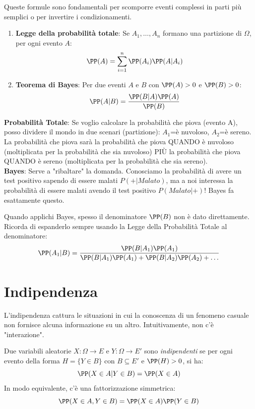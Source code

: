 Queste formule sono fondamentali per scomporre eventi complessi in parti più semplici o per invertire i condizionamenti.

\begin{theorem}
\begin{enumerate}
    \item \textbf{Legge della probabilità totale}: Se $A_1, \dots, A_n$ formano una partizione di $\Omega$, per ogni evento $A$:
    \[ \PP(A) = \sum_{i=1}^n \PP(A_i) \PP(A|A_i) \]
    \item \textbf{Teorema di Bayes}: Per due eventi $A$ e $B$ con $\PP(A)>0$ e $\PP(B)>0$:
    \[ \PP(A|B) = \frac{\PP(B|A)\PP(A)}{\PP(B)} \]
\end{enumerate}
\end{theorem}

\begin{spiegazione}
    \textbf{Probabilità Totale}: Se voglio calcolare la probabilità che piova (evento A), posso dividere il mondo in due scenari (partizione): $A_1$=è nuvoloso, $A_2$=è sereno. La probabilità che piova sarà la probabilità che piova QUANDO è nuvoloso (moltiplicata per la probabilità che sia nuvoloso) PIÙ la probabilità che piova QUANDO è sereno (moltiplicata per la probabilità che sia sereno). \\
    \textbf{Bayes}: Serve a "ribaltare" la domanda. Conosciamo la probabilità di avere un test positivo sapendo di essere malati $P(+|Malato)$, ma a noi interessa la probabilità di essere malati avendo il test positivo $P(Malato|+)$! Bayes fa esattamente questo.
\end{spiegazione}

\begin{hint}
    Quando applichi Bayes, spesso il denominatore $\PP(B)$ non è dato direttamente. Ricorda di espanderlo sempre usando la Legge della Probabilità Totale al denominatore: 
    \[ \PP(A_1|B) = \frac{\PP(B|A_1)\PP(A_1)}{\PP(B|A_1)\PP(A_1) + \PP(B|A_2)\PP(A_2) + \dots} \]
\end{hint}

\section{Indipendenza}

L'indipendenza cattura le situazioni in cui la conoscenza di un fenomeno casuale non fornisce alcuna informazione su un altro. Intuitivamente, non c'è "interazione".

\begin{definition}
Due variabili aleatorie $X : \Omega \to E$ e $Y : \Omega \to E'$ sono \emph{indipendenti} se per ogni evento della forma $H = \{Y \in B\}$ con $B \subseteq E'$ e $\PP(H)>0$, si ha:
\[ \PP(X \in A | Y \in B) = \PP(X \in A) \]
In modo equivalente, c'è una fattorizzazione simmetrica:
\[ \PP(X \in A, Y \in B) = \PP(X \in A)\PP(Y \in B) \]
\end{definition}

